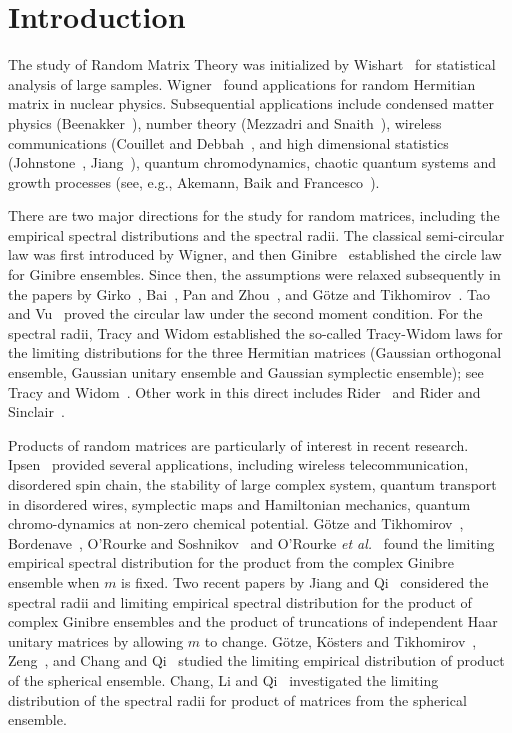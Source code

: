 \documentclass[11pt]{article}
\numberwithin{equation}{section}
\begin{document}
\newpage

\section{Introduction}\label{intro}



The study of Random Matrix Theory was initialized by
Wishart~\cite{Wishart} for statistical analysis of large samples.
Wigner~\cite{Wigner} found applications for random Hermitian matrix
in nuclear physics. Subsequential applications include condensed
matter physics (Beenakker~\cite{Been1997}), number theory (Mezzadri
and Snaith~\cite{MS2005}), wireless communications (Couillet and
Debbah~\cite{CD}, and high dimensional statistics
(Johnstone~\cite{John2001, John2008}, Jiang~\cite{Jiang09}), quantum
chromodynamics, chaotic quantum systems and growth processes (see,
e.g., Akemann, Baik and Francesco~\cite{ABF2011}).


There are two major directions for the study for random matrices,
including the empirical spectral distributions and the spectral
radii. The classical semi-circular law was first introduced by
Wigner, and then Ginibre~\cite{Ginibre} established the circle law
for Ginibre ensembles. Since then, the assumptions were relaxed
subsequently in the papers by Girko~\cite{Girko},  Bai~\cite{Bai},
Pan and Zhou~\cite{Pan}, and G\"otze and Tikhomirov~\cite{GF-TA}.
Tao and Vu~\cite{Tao} proved the circular law under the second
moment condition. For the spectral radii, Tracy and Widom
established the so-called Tracy-Widom laws for the limiting
distributions for the three Hermitian matrices (Gaussian orthogonal
ensemble, Gaussian unitary ensemble and Gaussian symplectic
ensemble); see Tracy and Widom~\cite{Tracy94, Tracy96}. Other work
in this direct includes Rider~\cite{Rider2003, Rider2004} and Rider
and Sinclair~\cite{RS2014}.


Products of random matrices are particularly of interest in recent
research. Ipsen~\cite{Ipsen} provided several applications,
including wireless telecommunication, disordered spin chain, the
stability of large complex system, quantum transport in disordered
wires, symplectic maps and Hamiltonian mechanics, quantum
chromo-dynamics at non-zero chemical potential. G\"{o}tze and
Tikhomirov~\cite{Goetz}, Bordenave~\cite{Bor}, O'Rourke and
Soshnikov~\cite{Rourke} and O'Rourke {\it et al.}~\cite{Rourke14}
found the limiting empirical spectral distribution for the product
from the complex Ginibre ensemble when $m$ is fixed.  Two recent
papers by Jiang and Qi~\cite{JiangQi2017, JiangQi2019} considered
the spectral radii and limiting empirical spectral distribution for
the product of complex Ginibre ensembles and the product of
truncations of independent Haar unitary matrices by allowing $m$ to
change. G\"otze, K\"osters and Tikhomirov~\cite{GKT2015},
Zeng~\cite{Zeng2016}, and Chang and Qi~\cite{ChangQi2017} studied
the limiting empirical distribution of product of the spherical
ensemble. Chang, Li and Qi~\cite{ChangLiQi2018} investigated the
limiting distribution of the spectral radii for product of matrices
from the spherical ensemble.
\end{document}
